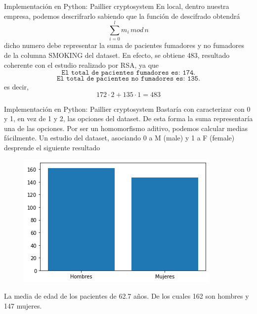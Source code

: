 \documentclass{beamer}
\begin{document}
\begin{frame}{Implementación en Python: Paillier cryptosystem}
En local, dentro nuestra empresa, podemos descrifrarlo sabiendo que la función de descifrado obtendrá
$$  \sum_{i=0}^l m_i \, mod \, n  $$  
dicho numero debe representar la suma de pacientes fumadores y no fumadores de la columna SMOKING del dataset. En efecto, se obtiene 483, resultado coherente con el estudio realizado por RSA, ya que 
$$ \texttt{El total de pacientes fumadores es: 174.} $$ 
$$ \texttt{El total de pacientes no fumadores es: 135.} $$
es decir, 
$$ 172 \cdot 2 + 135 \cdot  1 = 483 $$
\end{frame}
\begin{frame}{Implementación en Python: Paillier cryptosystem}
Bastaría con caracterizar con 0 y 1, en vez de 1 y 2, las opciones del dataset. De esta forma la suma representaría una de las opciones. 
\newline
\newline
Por ser un homomorfismo aditivo, podemos calcular medias fácilmente. Un estudio del dataset, asociando 0 a M (male) y 1 a F (female) desprende el siguiente resultado 
\begin{figure}[H]
    	\centering
		\includegraphics[scale=0.45]{IMG/grafica.png}
	\end{figure}
La media de edad de los pacientes de 62.7 años. De los cuales 162 son hombres y 147 mujeres. 
\end{frame}
\end{document}
